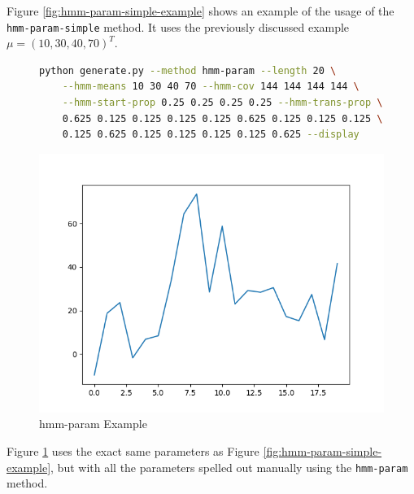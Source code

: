 Figure \ref{fig:hmm-param-simple-example} shows an example of the usage of the \texttt{hmm-param-simple} method. It uses the previously discussed example $\mu = (10, 30, 40, 70)^T$. 

\newpage

\begin{figure}
\begin{lstlisting}[language=bash]
    python generate.py --method hmm-param --length 20 \
    --hmm-means 10 30 40 70 --hmm-cov 144 144 144 144 \
    --hmm-start-prop 0.25 0.25 0.25 0.25 --hmm-trans-prop \
    0.625 0.125 0.125 0.125 0.125 0.625 0.125 0.125 0.125 \
    0.125 0.625 0.125 0.125 0.125 0.125 0.625 --display
\end{lstlisting}
\includegraphics[scale=0.7]{figures/hmm-param}
\caption{hmm-param Example}    
\label{fig:hmm-param-example}
\end{figure}

Figure \ref{fig:hmm-param-example} uses the exact same parameters as Figure \ref{fig:hmm-param-simple-example}, but with all the parameters spelled out manually using the \texttt{hmm-param} method. 

\newpage

